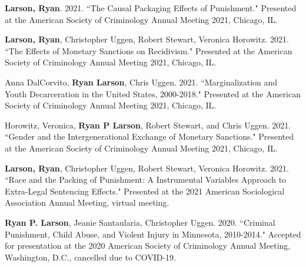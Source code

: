 \documentclass[letterpaper]{article}
\renewenvironment{itemize}{
  \begin{list}{}{
    \setlength{\leftmargin}{1.5em}
  }
}{
  \end{list}
}
\begin{document}
\begin{itemize}
\item \textbf{Larson, Ryan}. 2021. ``The Causal Packaging Effects of Punishment." Presented at the American Society of Criminology Annual Meeting 2021, Chicago, IL. 

\item \textbf{Larson, Ryan}, Christopher Uggen, Robert Stewart, Veronica Horowitz. 2021. ``The Effects of Monetary Sanctions on Recidivism." Presented at the American Society of Criminology Annual Meeting 2021, Chicago, IL. 

\item Anna DalCorvito, \textbf{Ryan Larson}, Chris Uggen. 2021. ``Marginalization and Youth Decarceration in the United States, 2000-2018." Presented at the American Society of Criminology Annual Meeting 2021, Chicago, IL. 

\item Horowitz, Veronica, \textbf{Ryan P Larson}, Robert Stewart, and Chris Uggen. 2021. ``Gender and the Intergenerational Exchange of Monetary Sanctions." Presented at the American Society of Criminology Annual Meeting 2021, Chicago, IL. 

\item \textbf{Larson, Ryan}, Christopher Uggen, Robert Stewart, Veronica Horowitz. 2021. ``Race and the Packing of Punishment: A Instrumental Variables Approach to Extra-Legal Sentencing Effects." Presented at the 2021 American Sociological Association Annual Meeting, virtual meeting. 

\item \textbf{Ryan P. Larson}, Jeanie Santaularia, Christopher Uggen. 2020. ``Criminal Punishment, Child Abuse, and Violent Injury in Minnesota, 2010-2014." Accepted for presentation at the 2020 American Society of Criminology Annual Meeting, Washington, D.C., cancelled due to COVID-19.  


\end{itemize}
\end{document}

